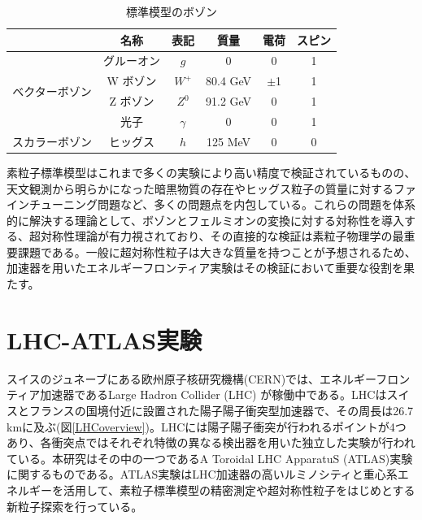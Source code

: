 \begin{table}[]
    \centering
    \caption[標準模型のボゾン]{標準模型のボゾン}
    \label{tab:bozon}

    \begin{tabular}{cccccc}
    \hline
                                                                                           & 名称        & 表記           & 質量                 & 電荷   & スピン \\ 
    \hline\hline
    \multicolumn{1}{c|}{\multirow{4}{*}{ベクターボゾン}}  & グルーオン       & $g$            & 0            & 0 & 1 \\
    \multicolumn{1}{c|}{}                                            &   W ボゾン     & $W^{+}$            & 80.4 GeV            & $\pm$1 & 1 \\ 
    \multicolumn{1}{c|}{}                       & Z ボゾン      & $Z^{0}$           & 91.2 GeV            & 0 & 1 \\
    \multicolumn{1}{c|}{}                                            & 光子    & $\gamma$            & 0             & 0 & 1 \\
    \hline\hline
    \multicolumn{1}{c|}{\multirow{1}{*}{スカラーボゾン}}  & ヒッグス  & $h$    & 125 MeV     & 0    & 0 \\
    \hline
    \end{tabular}
\end{table}


素粒子標準模型はこれまで多くの実験により高い精度で検証されているものの、天文観測から明らかになった暗黒物質の存在やヒッグス粒子の質量に対するファインチューニング問題など、多くの問題点を内包している。これらの問題を体系的に解決する理論として、ボゾンとフェルミオンの変換に対する対称性を導入する、超対称性理論が有力視されており、その直接的な検証は素粒子物理学の最重要課題である。一般に超対称性粒子は大きな質量を持つことが予想されるため、加速器を用いたエネルギーフロンティア実験はその検証において重要な役割を果たす。
\section{LHC-ATLAS実験}
\label{sec_intro_atlas}

スイスのジュネーブにある欧州原子核研究機構(CERN)では、エネルギーフロンティア加速器であるLarge Hadron Collider (LHC) が稼働中である。LHCはスイスとフランスの国境付近に設置された陽子陽子衝突型加速器で、その周長は26.7 kmに及ぶ(図\ref{LHCoverview})。LHCには陽子陽子衝突が行われるポイントが4つあり、各衝突点ではそれぞれ特徴の異なる検出器を用いた独立した実験が行われている。本研究はその中の一つであるA Toroidal LHC ApparatuS (ATLAS)実験に関するものである。ATLAS実験はLHC加速器の高いルミノシティと重心系エネルギーを活用して、素粒子標準模型の精密測定や超対称性粒子をはじめとする新粒子探索を行っている。

